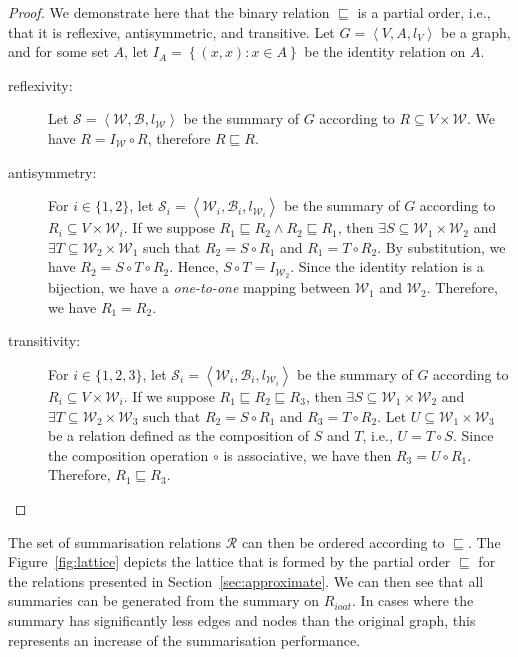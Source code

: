 \begin{proof}
	We demonstrate here that the binary relation $\sqsubseteq$ is a partial order, i.e., that it is reflexive, antisymmetric, and transitive.
	Let $G=\left\langle V, A, l_V \right\rangle$ be a graph, and for some set $A$, let $I_A = \left\lbrace (x, x) : x \in A \right\rbrace$ be the identity relation on $A$.
	\begin{description}
		\item[reflexivity:] Let $\mathcal{S} = \left\langle \mathcal{W}, \mathcal{B}, l_{\mathcal{W}} \right\rangle$ be the summary of $G$ according to $R \subseteq V \times \mathcal{W}$. We have $R = I_\mathcal{W} \circ R$, therefore $R \sqsubseteq R$.
		\item[antisymmetry:] For $i \in \{1, 2\}$, let $\mathcal{S}_i = \left\langle \mathcal{W}_i, \mathcal{B}_i, l_{\mathcal{W}_i} \right\rangle$ be the summary of $G$ according to $R_i \subseteq V \times \mathcal{W}_i$. If we suppose $R_1 \sqsubseteq R_2 \wedge R_2 \sqsubseteq R_1$, then $\exists S \subseteq \mathcal{W}_1 \times \mathcal{W}_2$ and $\exists T \subseteq \mathcal{W}_2 \times \mathcal{W}_1$ such that $R_2 = S \circ R_1$ and $R_1 = T \circ R_2$. By substitution, we have $R_2 = S \circ T \circ R_2$. Hence, $S \circ T = I_{\mathcal{W}_2}$. Since the identity relation is a bijection, we have a \emph{one-to-one} mapping between $\mathcal{W}_1$ and $\mathcal{W}_2$. Therefore, we have $R_1 = R_2$.
		\item[transitivity:] For $i \in \{1, 2, 3\}$, let $\mathcal{S}_i = \left\langle \mathcal{W}_i, \mathcal{B}_i, l_{\mathcal{W}_i} \right\rangle$ be the summary of $G$ according to $R_i \subseteq V \times \mathcal{W}_i$. If we suppose $R_1 \sqsubseteq R_2 \sqsubseteq R_3$, then $\exists S \subseteq \mathcal{W}_1 \times \mathcal{W}_2$ and $\exists T \subseteq \mathcal{W}_2 \times \mathcal{W}_3$ such that $R_2 = S \circ R_1$ and $R_3 = T \circ R_2$. Let $U \subseteq \mathcal{W}_1 \times \mathcal{W}_3$ be a relation defined as the composition of $S$ and $T$, i.e., $U = T \circ S$. Since the composition operation $\circ$ is associative, we have then $R_3 = U \circ R_1$. Therefore, $R_1 \sqsubseteq R_3$.
	\end{description}
\end{proof}

The set of summarisation relations $\mathcal{R}$ can then be ordered according to $\sqsubseteq$. The Figure~\ref{fig:lattice} depicts the lattice that is formed by the partial order $\sqsubseteq$ for the relations presented in Section~\ref{sec:approximate}. We can then see that all summaries can be generated from the summary on $R_{ioat}$. In cases where the summary has significantly less edges and nodes than the original graph, this represents an increase of the summarisation performance.

